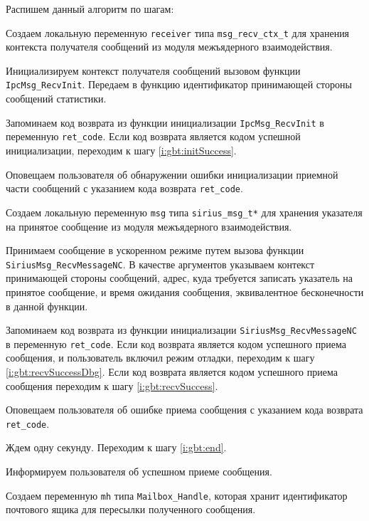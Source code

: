 Распишем данный алгоритм по шагам:
\begin{enumerate_step}
    \item Создаем локальную переменную \texttt{receiver} типа
    \texttt{msg\_recv\_ctx\_t} для хранения контекста получателя сообщений из
    модуля межъядерного взаимодействия.
    \item Инициализируем контекст получателя сообщений вызовом функции
    \texttt{IpcMsg\_RecvInit}. Передаем в функцию идентификатор принимающей
    стороны сообщений статистики.
    \item Запоминаем код возврата из функции инициализации \texttt{IpcMsg\_RecvInit}
    в переменную \texttt{ret\_code}. Если код возврата является кодом успешной
    инициализации, переходим к шагу \ref{i:gbt:initSuccess}.
    \item Оповещаем пользователя об обнаружении ошибки инициализации приемной
    части сообщений с указанием кода возврата \texttt{ret\_code}.
    \item \label{i:gbt:initSuccess} Создаем локальную переменную \texttt{msg}
    типа \verb|sirius_msg_t*| для хранения указателя на принятое сообщение из
    модуля межъядерного взаимодействия.
    \item Принимаем сообщение в ускоренном режиме путем вызова функции
    \verb|SiriusMsg_RecvMessageNC|. В качестве аргументов указываем контекст
    принимающей стороны сообщений, адрес, куда требуется записать указатель на
    принятое сообщение, и время ожидания сообщения, эквивалентное бесконечности
    в данной функции.
    \item Запоминаем код возврата из функции инициализации
    \verb|SiriusMsg_RecvMessageNC| в переменную \texttt{ret\_code}.
    Если код возврата является кодом успешного приема сообщения, и пользователь
    включил режим отладки, переходим к шагу \ref{i:gbt:recvSuccessDbg}.
    Если код возврата является кодом успешного приема сообщения переходим
    к шагу \ref{i:gbt:recvSuccess}.
    \item Оповещаем пользователя об ошибке приема сообщения с указанием
    кода возврата \verb|ret_code|.
    \item Ждем одну секунду. Переходим к шагу \ref{i:gbt:end}.
    \item \label{i:gbt:recvSuccessDbg} Информируем пользователя об успешном приеме
    сообщения.
    \item \label{i:gbt:recvSuccess} Создаем переменную \verb|mh| типа \verb|Mailbox_Handle|, которая хранит
    идентификатор почтового ящика для пересылки полученного сообщения.

\end{enumerate_step}
